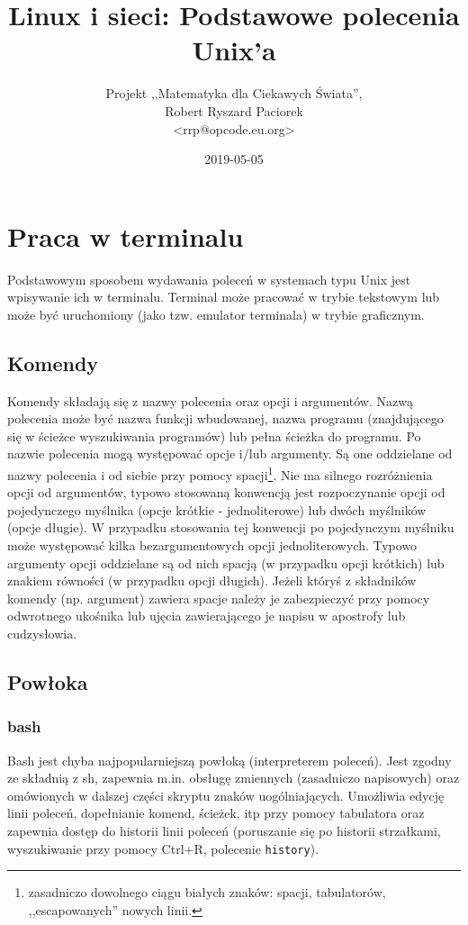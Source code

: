 \documentclass{pdfBooklets}
\title{Linux i sieci: Podstawowe polecenia Unix'a}
\author{%
	Projekt ,,Matematyka dla Ciekawych Świata'',\\
	Robert Ryszard Paciorek\\\normalsize\ttfamily <rrp@opcode.eu.org>
}
\date  {2019-05-05}
\begin{document}
\maketitle

\section{Praca w terminalu}

Podstawowym sposobem wydawania poleceń w systemach typu Unix jest wpisywanie ich w terminalu.
Terminal może pracować w trybie tekstowym lub może być uruchomiony (jako tzw. emulator terminala) w trybie graficznym.

\subsection{Komendy}

Komendy składają się z nazwy polecenia oraz opcji i argumentów.
Nazwą polecenia może być nazwa funkcji wbudowanej, nazwa programu (znajdującego się w ścieżce wyszukiwania programów) lub pełna ścieżka do programu.
Po nazwie polecenia mogą występować opcje i/lub argumenty. Są one oddzielane od nazwy polecenia i od siebie przy pomocy spacji\footnote{
	zasadniczo dowolnego ciągu białych znaków: spacji, tabulatorów, ,,escapowanych'' nowych linii.
}.
Nie ma silnego rozróżnienia opcji od argumentów, typowo stosowaną konwencją jest rozpoczynanie opcji od pojedynczego myślnika (opcje krótkie - jednoliterowe) lub dwóch myślników (opcje długie).
	W przypadku stosowania tej konwencji po pojedynczym myślniku może występować kilka bezargumentowych opcji jednoliterowych.
	Typowo argumenty opcji oddzielane są od nich spacją (w przypadku opcji krótkich) lub znakiem równości (w przypadku opcji długich).
Jeżeli któryś z składników komendy (np. argument) zawiera spacje należy je zabezpieczyć przy pomocy odwrotnego ukośnika lub ujęcia zawierającego je napisu w apostrofy lub cudzysłowia.

\subsection{Powłoka}

\subsubsection{bash}
Bash jest chyba najpopularniejszą powłoką (interpreterem poleceń).
Jest zgodny ze składnią z sh, zapewnia m.in. obsługę zmiennych (zasadniczo napisowych) oraz omówionych w dalszej części skryptu znaków uogólniających.
Umożliwia edycję linii poleceń, dopełnianie komend, ścieżek, itp przy pomocy tabulatora oraz zapewnia dostęp do historii linii poleceń (poruszanie się po historii strzałkami, wyszukiwanie przy pomocy Ctrl+R, polecenie \texttt{history}).
\end{document}
